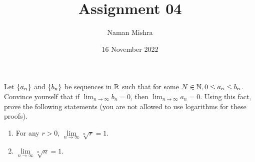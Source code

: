 \documentclass[12pt]{article}
\title{Assignment 04}
\author{Naman Mishra}
\date{16 November 2022}
\begin{document}
\maketitle

\begin{problem}
    Let $\set{a_{n}}$ and $\set{b_{n}}$ be sequences in $\mathbb{R}$ such that for some $N \in \mathbb{N}, 0 \leq a_{n} \leq b_{n}$.
    Convince yourself that if $\lim_{n \to \infty} b_{n} = 0$, then $\lim_{n \to \infty} a_{n} = 0$.
    Using this fact, prove the following statements (you are not allowed to use logarithms for these proofs).
    \begin{enumerate}[label=(\alph*)]
        \item For any $r > 0$, $\lim\limits_{n \to \infty} \sqrt[n]{r} = 1$.
        \item $\lim\limits_{n \to \infty} \sqrt[n]{n} = 1$.
    \end{enumerate}
\end{problem}
\end{document}
